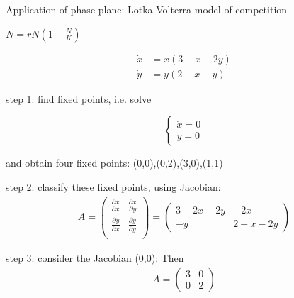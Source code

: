 \documentclass[9pt,aspectratio=43,mathserif,table]{beamer}
\begin{document}
\begin{frame}[label=current]{Application of phase plane: Lotka-Volterra model of competition}
  \begin{multicols}{2}
    $\dot N = r N (1- \frac{ N}{K})$

   
    \begin{equation}
      \begin{aligned}
        \dot x &= x(3-x-2y) \\
        \dot y &= y(2-x-y)
      \end{aligned}
    \end{equation}

    step 1: find fixed points, i.e. solve

    \begin{equation}
      \left\{
      \begin{aligned}
         \dot x = 0 \\
         \dot y = 0
      \end{aligned}
      \right.
    \end{equation}

    and obtain four fixed points: (0,0),(0,2),(3,0),(1,1)
    
    \medskip
    
    step 2: classify these fixed points, using Jacobian:
    \scriptsize{
    \begin{equation}
      \begin{aligned}
        A = 
        \begin{pmatrix}
          \frac{ \partial \dot x}{\partial x} & \frac{ \partial \dot x}{\partial y} \\
          \frac{ \partial \dot y}{\partial x} & \frac{ \partial \dot y}{\partial y} \\
        \end{pmatrix}
        = 
        \begin{pmatrix}
          3 - 2x - 2y & -2x \\
          -y & 2-x-2y
        \end{pmatrix}
      \end{aligned}
    \end{equation}
    }

    \normalsize
    step 3: consider the Jacobian
    (0,0): Then 
    \begin{equation}
      \begin{aligned}
        A = 
        \begin{pmatrix}
           3 & 0\\
           0 & 2
        \end{pmatrix}
      \end{aligned}
    \end{equation}


\end{multicols}
\end{frame}
\end{document}
